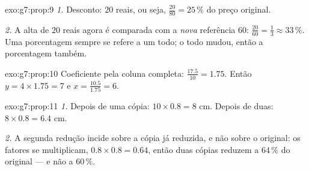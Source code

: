 \begin{solution}{exo:g7:prop:9}
\emph{1.} Desconto: $20$ reais, ou seja, $\frac{20}{80} = 25\,\%$ do
preço original.

\emph{2.} A alta de $20$ reais agora é comparada com a \emph{nova}
referência $60$: $\frac{20}{60} = \frac13 \approx 33\,\%$. Uma
porcentagem sempre se refere a um todo; o todo mudou, então a
porcentagem também.
\end{solution}

\begin{solution}{exo:g7:prop:10}
Coeficiente pela coluna completa: $\frac{17.5}{10} = 1.75$. Então
$y = 4 \times 1.75 = 7$ e $x = \frac{10.5}{1.75} = 6$.
\end{solution}

\begin{solution}{exo:g7:prop:11}
\emph{1.} Depois de uma cópia: $10 \times 0.8 = 8$ cm. Depois de duas:
$8 \times 0.8 = 6.4$ cm.

\emph{2.} A segunda redução incide sobre a cópia já reduzida, e não
sobre o original: os fatores se multiplicam,
$0.8 \times 0.8 = 0.64$, então duas cópias reduzem a $64\,\%$ do
original --- e não a $60\,\%$.
\end{solution}

